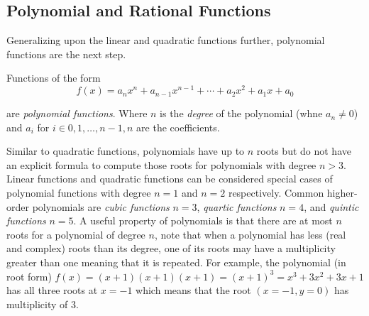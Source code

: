 \subsection{Polynomial and Rational Functions}
Generalizing upon the linear and quadratic functions further, polynomial functions are the next step.

\begin{definition}
    Functions of the form
    \begin{equation}
        f(x) = a_n x^n + a_{n-1} x^{n-1} + \cdots + a_2 x^2 + a_1 x + a_0
    \end{equation}

    \noindent are \textit{polynomial functions}. Where $n$ is the \textit{degree} of the polynomial (whne $a_n \neq 0$) and $a_i$ for $i \in {0,1,\dots,n-1,n}$ are the coefficients.
\end{definition}

Similar to quadratic functions, polynomials have up to $n$ roots but do not have an explicit formula to compute those roots for polynomials with degree $n > 3$. Linear functions and quadratic functions can be considered special cases of polynomial functions with degree $n=1$ and $n=2$ respectively. Common higher-order polynomials are \textit{cubic functions} $n=3$, \textit{quartic functions} $n=4$, and \textit{quintic functions} $n=5$. A useful property of polynomials is that there are at most $n$ roots for a polynomial of degree $n$, note that when a polynomial has less (real and complex) roots than its degree, one of its roots may have a multiplicity greater than one meaning that it is repeated. For example, the polynomial (in root form) $f(x) = (x+1)(x+1)(x+1) = (x+1)^3 = x^3 + 3x^2 + 3x + 1$ has all three roots at $x=-1$ which means that the root $(x=-1,y=0)$ has multiplicity of 3.

